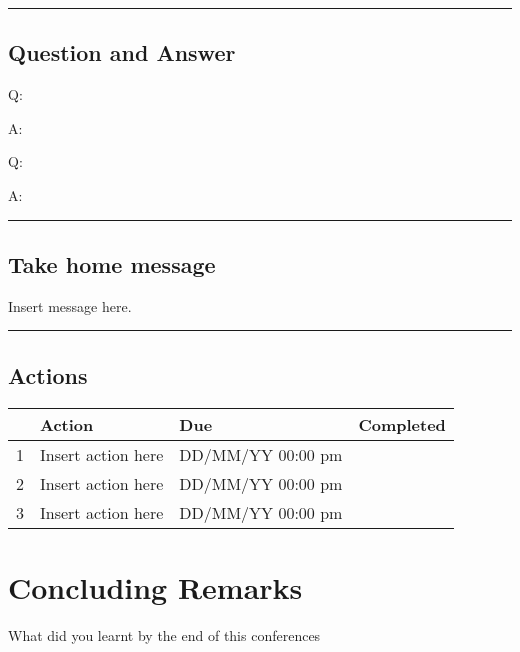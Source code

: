 \documentclass[
]{book}
\begin{document}
\begin{center}\rule{0.5\linewidth}{0.5pt}\end{center}

\hypertarget{question-and-answer-49}{%
\section*{Question and Answer}\label{question-and-answer-49}}

Q:

A:

Q:

A:

\begin{center}\rule{0.5\linewidth}{0.5pt}\end{center}

\hypertarget{take-home-message-49}{%
\section*{Take home message}\label{take-home-message-49}}

Insert message here.

\begin{center}\rule{0.5\linewidth}{0.5pt}\end{center}

\hypertarget{actions-49}{%
\section*{Actions}\label{actions-49}}

\begin{longtable}[]{@{}llll@{}}
\toprule
& Action & Due & Completed\tabularnewline
\midrule
\endhead
1 & Insert action here & DD/MM/YY 00:00 pm &\tabularnewline
2 & Insert action here & DD/MM/YY 00:00 pm &\tabularnewline
3 & Insert action here & DD/MM/YY 00:00 pm &\tabularnewline
\bottomrule
\end{longtable}

\hypertarget{concluding-remarks}{%
\chapter*{Concluding Remarks}\label{concluding-remarks}}

What did you learnt by the end of this conferences
\end{document}
